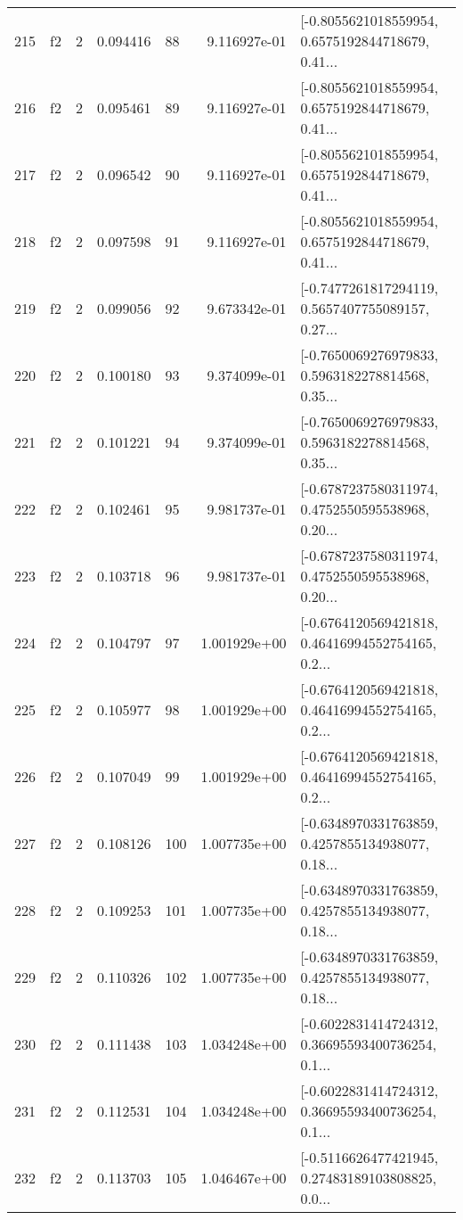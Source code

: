 \begin{tabular}{lllrlrl}
215 &  f2 &   2 &  0.094416 &   88 &  9.116927e-01 &  [-0.8055621018559954, 0.6575192844718679, 0.41... \\
216 &  f2 &   2 &  0.095461 &   89 &  9.116927e-01 &  [-0.8055621018559954, 0.6575192844718679, 0.41... \\
217 &  f2 &   2 &  0.096542 &   90 &  9.116927e-01 &  [-0.8055621018559954, 0.6575192844718679, 0.41... \\
218 &  f2 &   2 &  0.097598 &   91 &  9.116927e-01 &  [-0.8055621018559954, 0.6575192844718679, 0.41... \\
219 &  f2 &   2 &  0.099056 &   92 &  9.673342e-01 &  [-0.7477261817294119, 0.5657407755089157, 0.27... \\
220 &  f2 &   2 &  0.100180 &   93 &  9.374099e-01 &  [-0.7650069276979833, 0.5963182278814568, 0.35... \\
221 &  f2 &   2 &  0.101221 &   94 &  9.374099e-01 &  [-0.7650069276979833, 0.5963182278814568, 0.35... \\
222 &  f2 &   2 &  0.102461 &   95 &  9.981737e-01 &  [-0.6787237580311974, 0.4752550595538968, 0.20... \\
223 &  f2 &   2 &  0.103718 &   96 &  9.981737e-01 &  [-0.6787237580311974, 0.4752550595538968, 0.20... \\
224 &  f2 &   2 &  0.104797 &   97 &  1.001929e+00 &  [-0.6764120569421818, 0.46416994552754165, 0.2... \\
225 &  f2 &   2 &  0.105977 &   98 &  1.001929e+00 &  [-0.6764120569421818, 0.46416994552754165, 0.2... \\
226 &  f2 &   2 &  0.107049 &   99 &  1.001929e+00 &  [-0.6764120569421818, 0.46416994552754165, 0.2... \\
227 &  f2 &   2 &  0.108126 &  100 &  1.007735e+00 &  [-0.6348970331763859, 0.4257855134938077, 0.18... \\
228 &  f2 &   2 &  0.109253 &  101 &  1.007735e+00 &  [-0.6348970331763859, 0.4257855134938077, 0.18... \\
229 &  f2 &   2 &  0.110326 &  102 &  1.007735e+00 &  [-0.6348970331763859, 0.4257855134938077, 0.18... \\
230 &  f2 &   2 &  0.111438 &  103 &  1.034248e+00 &  [-0.6022831414724312, 0.36695593400736254, 0.1... \\
231 &  f2 &   2 &  0.112531 &  104 &  1.034248e+00 &  [-0.6022831414724312, 0.36695593400736254, 0.1... \\
232 &  f2 &   2 &  0.113703 &  105 &  1.046467e+00 &  [-0.5116626477421945, 0.27483189103808825, 0.0... \\

\end{tabular}
